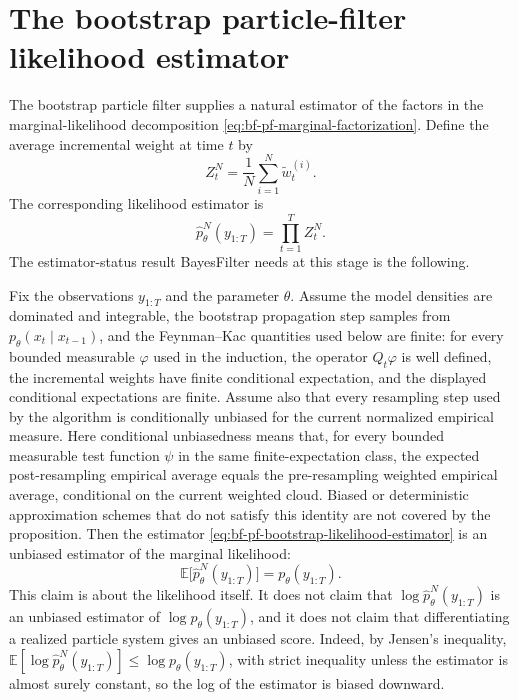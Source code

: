 \section{The bootstrap particle-filter likelihood estimator}
\label{sec:bf-pf-likelihood-estimator}

The bootstrap particle filter supplies a natural estimator of the factors in the
marginal-likelihood decomposition
\eqref{eq:bf-pf-marginal-factorization}.  Define the average incremental weight
at time $t$ by
\begin{equation}
\label{eq:bf-pf-average-weight}
  Z_t^N = \frac{1}{N}\sum_{i=1}^N \tilde w_t^{(i)}.
\end{equation}
The corresponding likelihood estimator is
\begin{equation}
\label{eq:bf-pf-bootstrap-likelihood-estimator}
  \hat p_\theta^N(y_{1:T}) = \prod_{t=1}^T Z_t^N.
\end{equation}
The estimator-status result BayesFilter needs at this stage is the following.

\begin{proposition}
\label{prop:bf-pf-bootstrap-likelihood-status}
Fix the observations $y_{1:T}$ and the parameter $\theta$.  Assume the model
densities are dominated and integrable, the bootstrap propagation step samples
from $p_\theta(x_t\mid x_{t-1})$, and the Feynman--Kac quantities used below
are finite: for every bounded measurable $\varphi$ used in the induction,
the operator $Q_t\varphi$ is well defined, the incremental weights have finite
conditional expectation, and the displayed conditional expectations are finite.
Assume also that every resampling step used by the algorithm is conditionally
unbiased for the current normalized empirical measure.  Here conditional
unbiasedness means that, for every bounded measurable test function $\psi$ in
the same finite-expectation class, the expected post-resampling empirical
average equals the pre-resampling weighted empirical average, conditional on
the current weighted cloud.  Biased or deterministic approximation schemes that
do not satisfy this identity are not covered by the proposition.  Then the
estimator
\eqref{eq:bf-pf-bootstrap-likelihood-estimator} is an unbiased estimator of the
marginal likelihood:
\[
  \mathbb{E}\bigl[\hat p_\theta^N(y_{1:T})\bigr] = p_\theta(y_{1:T}).
\]
This claim is about the likelihood itself.  It does not claim that
$\log \hat p_\theta^N(y_{1:T})$ is an unbiased estimator of
$\log p_\theta(y_{1:T})$, and it does not claim that differentiating a realized
particle system gives an unbiased score.  Indeed, by Jensen's inequality,
$\mathbb E[\log \hat p_\theta^N(y_{1:T})]\le\log p_\theta(y_{1:T})$, with strict
inequality unless the estimator is almost surely constant, so the log of the
estimator is biased downward.
\end{proposition}


